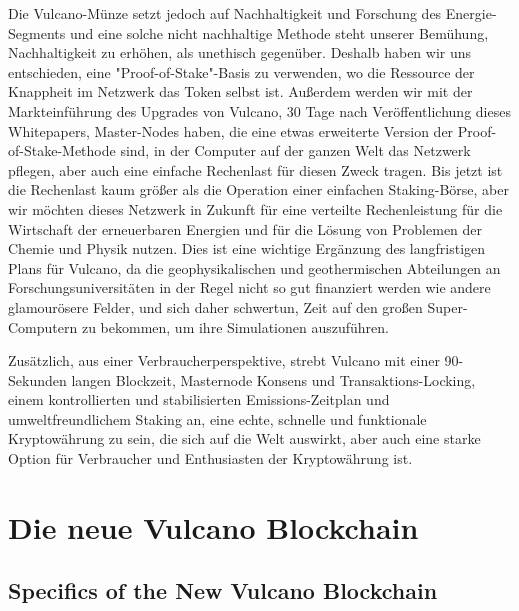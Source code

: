 \documentclass[A4paper, 12pt]{article}
\begin{document}
Die Vulcano-Münze setzt jedoch auf Nachhaltigkeit und Forschung des Energie- Segments und eine solche nicht nachhaltige Methode steht unserer Bemühung, Nachhaltigkeit zu erhöhen, als unethisch gegenüber. Deshalb haben wir uns entschieden, eine "Proof-of-Stake"-Basis zu verwenden, wo die Ressource der Knappheit im Netzwerk das Token selbst ist. Außerdem werden wir mit der Markteinführung des Upgrades von Vulcano, 30 Tage nach Veröffentlichung dieses Whitepapers, Master-Nodes haben, die eine etwas erweiterte Version der Proof-of-Stake-Methode sind, in der Computer auf der ganzen Welt das Netzwerk pflegen, aber auch eine einfache Rechenlast für diesen Zweck tragen. Bis jetzt ist  die Rechenlast kaum größer als die Operation einer einfachen Staking-Börse, aber wir möchten dieses Netzwerk in Zukunft für eine verteilte Rechenleistung für die Wirtschaft der erneuerbaren Energien und für die Lösung von Problemen der Chemie und Physik nutzen. Dies ist eine wichtige Ergänzung des langfristigen Plans für Vulcano, da die geophysikalischen und geothermischen Abteilungen an Forschungsuniversitäten in der Regel nicht so gut finanziert werden wie andere glamourösere Felder, und sich daher schwertun, Zeit auf den großen Super-Computern zu bekommen, um ihre Simulationen auszuführen. 

Zusätzlich, aus einer Verbraucherperspektive, strebt Vulcano mit einer 90-Sekunden langen Blockzeit, Masternode Konsens und Transaktions-Locking, einem kontrollierten und stabilisierten Emissions-Zeitplan und umweltfreundlichem Staking an, eine echte, schnelle und funktionale Kryptowährung zu sein, die sich auf die Welt auswirkt, aber auch eine starke Option für Verbraucher und Enthusiasten der Kryptowährung ist. 
\newpage
\section{Die neue Vulcano Blockchain}
\subsection{Specifics of the New Vulcano Blockchain}
\end{document}
